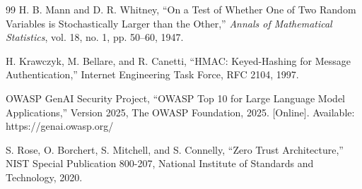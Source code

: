 \documentclass[12pt,a4paper]{report}
\begin{document}
\begin{thebibliography}{99}
H. B. Mann and D. R. Whitney, ``On a Test of Whether One of Two Random Variables is Stochastically Larger than the Other,'' \textit{Annals of Mathematical Statistics}, vol. 18, no. 1, pp. 50--60, 1947.

H. Krawczyk, M. Bellare, and R. Canetti, ``HMAC: Keyed-Hashing for Message Authentication,'' Internet Engineering Task Force, RFC 2104, 1997.

OWASP GenAI Security Project, ``OWASP Top 10 for Large Language Model Applications,'' Version 2025, The OWASP Foundation, 2025. [Online]. Available: https://genai.owasp.org/

S. Rose, O. Borchert, S. Mitchell, and S. Connelly, ``Zero Trust Architecture,'' NIST Special Publication 800-207, National Institute of Standards and Technology, 2020.

\end{thebibliography}
\end{document}

